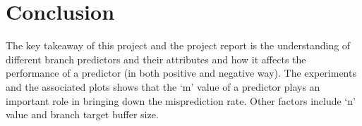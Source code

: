 \section{Conclusion}
The key takeaway of this project and the project report is the understanding of different branch predictors and their attributes and how it affects the performance of a predictor (in both positive and negative way). The experiments and the associated plots shows that the `m' value of a predictor plays an important role in bringing down the misprediction rate. Other factors include `n' value and branch target buffer size.

